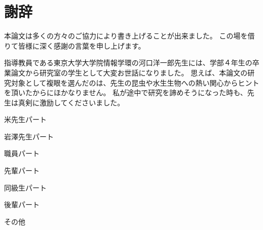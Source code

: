 \chapter*{謝辞}

本論文は多くの方々のご協力により書き上げることが出来ました。
この場を借りて皆様に深く感謝の言葉を申し上げます。

指導教員である東京大学大学院情報学環の河口洋一郎先生には、学部４年生の卒業論文から研究室の学生として大変お世話になりました。
思えば、本論文の研究対象として複眼を選んだのは、先生の昆虫や水生生物への熱い関心からヒントを頂いたからにほかなりません。
私が途中で研究を諦めそうになった時も、先生は真剣に激励してくださいました。


米先生パート

岩澤先生パート

職員パート

先輩パート

同級生パート

後輩パート

その他
